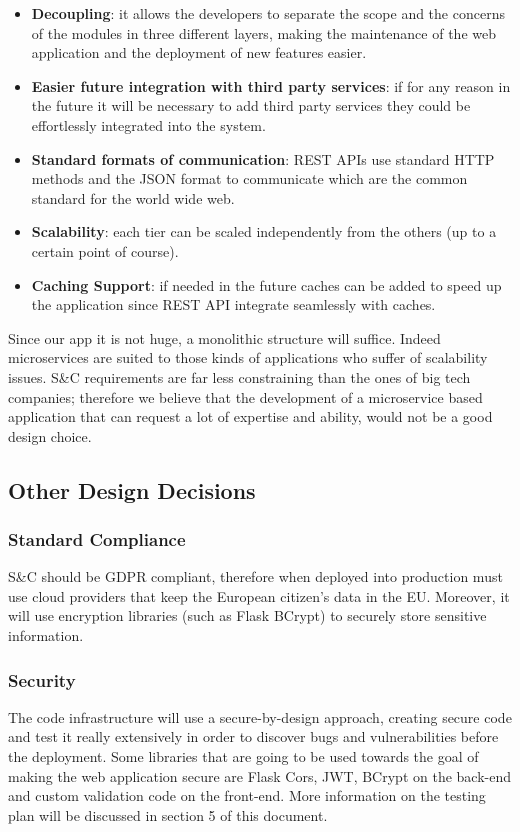 \begin{itemize}
    \item \textbf{Decoupling}: it allows the developers to separate the scope and the concerns of the modules in three different layers, making the maintenance of the web application and the deployment of new features easier.
    \item \textbf{Easier future integration with third party services}: if for any reason in the future it will be necessary to add third party services they could be  effortlessly integrated into the system. 
    \item \textbf{Standard formats of communication}: REST APIs use standard HTTP methods and the JSON format to communicate which are the common standard for the world wide web.
    \item \textbf{Scalability}: each tier can be scaled independently from the others (up to a certain point of course).
    \item \textbf{Caching Support}: if needed in the future caches can be added to speed up the application since REST API integrate seamlessly with caches.
\end{itemize}
   
    Since our app it is not huge, a monolithic structure will suffice. Indeed microservices are suited to those kinds of applications who suffer of scalability issues. S\&C requirements are far less constraining than the ones of big tech companies; therefore we believe that the development of a microservice based application that can request a lot of expertise and ability, would not be a good design choice. 
    
\subsection{Other Design Decisions}

\subsubsection{Standard Compliance}
S\&C should be GDPR compliant, therefore when deployed into production must use cloud providers that keep the European citizen's data in the EU. Moreover, it will use encryption libraries (such as Flask BCrypt) to securely store sensitive information. 

\subsubsection{Security}
The code infrastructure will use a secure-by-design approach, creating secure code and test it really extensively in order to discover bugs and vulnerabilities before the deployment. Some libraries that are going to be used towards the goal of making the web application secure are Flask Cors, JWT, BCrypt on the back-end and custom validation code on the front-end. More information on the testing plan will be discussed in section 5 of this document.

